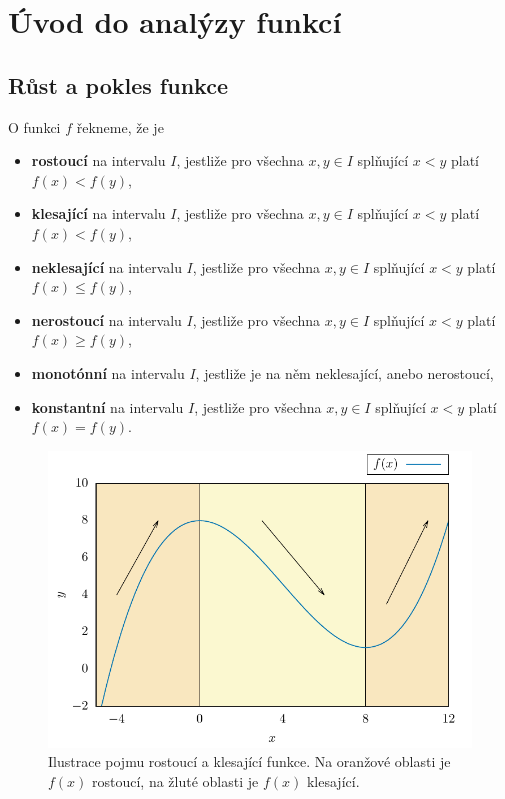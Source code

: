 \section*{Úvod do analýzy funkcí}
\subsection*{Růst a pokles funkce}
O funkci $f$ řekneme, že je \begin{itemize}
    \item \textbf{rostoucí} na intervalu $I$, jestliže pro všechna $x,y \in I$ splňující $x<y$ platí $f(x) < f(y)$,
    \item \textbf{klesající} na intervalu $I$, jestliže pro všechna $x,y \in I$ splňující $x<y$ platí $f(x) < f(y)$,
    \item \textbf{neklesající} na intervalu $I$, jestliže pro všechna $x,y \in I$ splňující $x<y$ platí $f(x) \leq f(y)$,
    \item \textbf{nerostoucí} na intervalu $I$, jestliže pro všechna $x,y \in I$ splňující $x<y$ platí $f(x) \geq f(y)$,
    \item \textbf{monotónní} na intervalu $I$, jestliže je na něm neklesající, anebo nerostoucí,
    \item \textbf{konstantní} na intervalu $I$, jestliže pro všechna $x,y \in I$ splňující $x<y$ platí $f(x) = f(y)$.
\end{itemize}

\begin{figure}[H]
    \centering
    \includegraphics[scale = 0.7]{Gnuplot/Figures/funkce-rostouci-klesajici-obr.pdf}
    \caption{Ilustrace pojmu rostoucí a klesající funkce. Na oranžové oblasti je $f(x)$ rostoucí, na žluté oblasti je $f(x)$ klesající.}
\end{figure}

